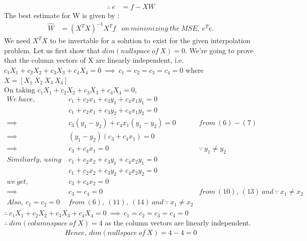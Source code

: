 \documentclass[a4paper,fleqn,11pt]{article}
\theoremstyle{mytheor}
\begin{document}
\begin{align}
\therefore\ e & = f - XW
\end{align}
The best estimate for W is given by : 
\begin{align}
\hat{W} & = (X^TX)^{-1}X^Tf & on\ minimizing\ the\ MSE,\ e^Te.
\end{align}
We need $X^TX$ to be invertable for a solution to exist for the given interpolation problem.
Let us first show that $dim(nullspace\ of\ X) = 0$. We're going to prove that the column vectors of X are linearly independent, i.e. $c_1X_1 + c_2X_2 + c_3X_3 + c_4X_4 = 0\ \implies\ c_1 = c_2 = c_3 = c_4 = 0$ where $X = [X_1\ X_2\ X_3\ X_4]$ \\
On taking $c_1X_1 + c_2X_2 + c_3X_3 + c_4X_4 = 0$,
\begin{align}
We\ have,\ & c_1 + c_2x_1 + c_3y_1 + c_4x_1y_1 = 0 \\
& c_1 + c_2x_1 + c_3y_2 + c_4x_1y_2 = 0 \\
\implies\ & c_3(y_1 - y_2) + c_4x_1(y_1 - y_2) = 0\ & from\ (6) - (7) \\
\implies\ & (y_1 - y_2)(c_3 + c_4x_1) = 0 \\
\implies\ & c_3 + c_4x_1 = 0\ & \because\ y_1 \neq y_2 \\
Similiarly,\ using\ & c_1 + c_2x_2 + c_3y_1 + c_4x_2y_1 = 0 \\
& c_1 + c_2x_2 + c_3y_2 + c_4x_2y_2 = 0 \\
we\ get,\ & c_3 + c_4x_2 = 0 \\
\implies\ & c_3 = c_4 = 0\ & from\ (10),\ (13)\ and\ \because\ x_1 \neq x_2 \\  
Also, \ c_1 = c_2 = 0\ & from\ (6),\ (11),\ (14)\ and\ \because\ x_1 \neq x_2
\end{align}
$\therefore\ c_1X_1 + c_2X_2 + c_3X_3 + c_4X_4 = 0\ \implies\ c_1 = c_2 = c_3 = c_4 = 0$ \\
$\therefore\ dim(columnspace\ of\ X) = 4$ as the column vectors are linearly independent.
\begin{align}
Hence,\ dim(nullspace\ of\ X) = 4 - 4 = 0
\end{align}
\end{document}
